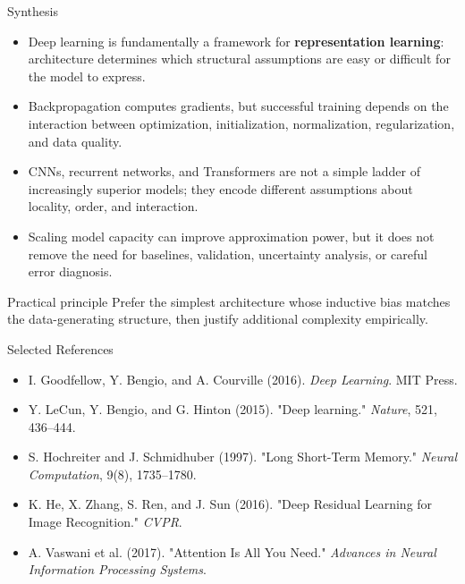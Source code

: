 \documentclass[aspectratio=169]{beamer}
\begin{document}
\begin{frame}{Synthesis}
  \begin{itemize}
    \item Deep learning is fundamentally a framework for \textbf{representation learning}: architecture determines which structural assumptions are easy or difficult for the model to express.
    \item Backpropagation computes gradients, but successful training depends on the interaction between optimization, initialization, normalization, regularization, and data quality.
    \item CNNs, recurrent networks, and Transformers are not a simple ladder of increasingly superior models; they encode different assumptions about locality, order, and interaction.
    \item Scaling model capacity can improve approximation power, but it does not remove the need for baselines, validation, uncertainty analysis, or careful error diagnosis.
  \end{itemize}

  \vspace{0.5em}

  \begin{alertbox}{Practical principle}
    Prefer the simplest architecture whose inductive bias matches the data-generating structure, then justify additional complexity empirically.
  \end{alertbox}
\end{frame}

\begin{frame}{Selected References}
  \small
  \begin{itemize}
    \item I. Goodfellow, Y. Bengio, and A. Courville (2016). \textit{Deep Learning}. MIT Press.
    \item Y. LeCun, Y. Bengio, and G. Hinton (2015). "Deep learning." \textit{Nature}, 521, 436--444.
    \item S. Hochreiter and J. Schmidhuber (1997). "Long Short-Term Memory." \textit{Neural Computation}, 9(8), 1735--1780.
    \item K. He, X. Zhang, S. Ren, and J. Sun (2016). "Deep Residual Learning for Image Recognition." \textit{CVPR}.
    \item A. Vaswani et al. (2017). "Attention Is All You Need." \textit{Advances in Neural Information Processing Systems}.
  \end{itemize}
\end{frame}

\contactslide
\end{document}
